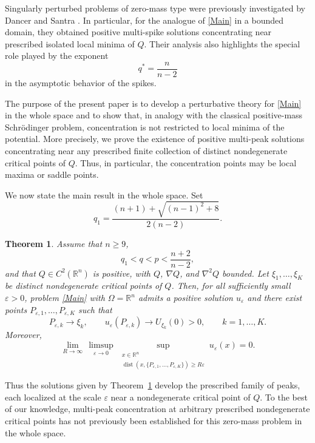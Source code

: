 \documentclass[12pt]{amsart}
\theoremstyle{plain}
\newtheorem{theorem}{Theorem}[section]   %
\theoremstyle{definition}
\theoremstyle{remark}
\renewcommand{\epsilon}{\varepsilon}
\begin{document}
Singularly perturbed problems of zero-mass type were previously
investigated by Dancer and Santra \cite{DancerSantra2010}. In particular,
for the analogue of \eqref{Main} in a bounded domain, they obtained
positive multi-spike solutions concentrating near prescribed isolated
local minima of \(Q\). Their analysis also highlights the special role
played by the exponent
\[
 q^*=\frac{n}{n-2}
\]
in the asymptotic behavior of the spikes.

The purpose of the present paper is to develop a perturbative theory for
\eqref{Main} in the whole space and to show that, in analogy with the
classical positive-mass Schr\"odinger problem, concentration is not
restricted to local minima of the potential. More precisely, we prove the
existence of positive multi-peak solutions concentrating near any
prescribed finite collection of distinct nondegenerate critical points of
\(Q\). Thus, in particular, the concentration points may be local maxima
or saddle points.

We now state the main result in the whole space. Set
\[
 q_1=\frac{(n+1)+\sqrt{(n-1)^2+8}}{2(n-2)}.
\]

\begin{theorem}\label{MainWholeSpace}
Assume that \(n\geq9\),
\[
 q_1<q<p<\frac{n+2}{n-2},
\]
and that \(Q\in C^2(\mathbb{R}^n)\) is positive, with \(Q\), \(\nabla Q\),
and \(\nabla^2Q\) bounded. Let
\(\xi_1,\ldots,\xi_K\) be distinct nondegenerate critical points of \(Q\).
Then, for all sufficiently small \(\epsilon>0\), problem
\eqref{Main} with \(\Omega=\mathbb{R}^n\) admits a positive solution
\(u_\epsilon\) and there exist points
\(P_{\epsilon,1},\ldots,P_{\epsilon,K}\) such that
\[
 P_{\epsilon,k}\longrightarrow\xi_k,
 \qquad
 u_\epsilon(P_{\epsilon,k})
 \longrightarrow U_{\xi_k}(0)>0,
 \qquad k=1,\ldots,K.
\]
Moreover,
\[
 \lim_{R\to\infty}\,
 \limsup_{\epsilon\to0}\,
 \sup_{\substack{x\in\mathbb{R}^n\\
 \operatorname{dist}(x,\{P_{\epsilon,1},\ldots,P_{\epsilon,K}\})
 \geq R\epsilon}}
 u_\epsilon(x)=0.
\]
\end{theorem}

Thus the solutions given by Theorem~\ref{MainWholeSpace} develop the
prescribed family of peaks, each localized at the scale \(\epsilon\) near
a nondegenerate critical point of \(Q\). To the best of our knowledge,
multi-peak concentration at arbitrary prescribed nondegenerate critical
points has not previously been established for this zero-mass problem in
the whole space.
\end{document}
